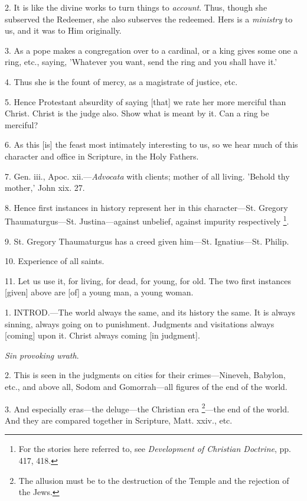 2. It is like the divine works to turn things to \emph{account}.
Thus, though she subserved the Redeemer, she also subserves the
redeemed. Hers is a \emph{ministry} to us, and it was to Him
originally.

3. As a pope makes a congregation over to a
cardinal, or a king gives some one a ring, etc., saying, 'Whatever you
want, send the ring and you shall have it.'

4. Thus she is the fount of mercy, as a
magistrate of justice, etc.

5. Hence Protestant absurdity of saying [that] we
rate her more merciful than Christ. Christ is the judge also. Show
what is meant by it. Can a ring be merciful?

6. As this [is] the feast most intimately
interesting to us, so we hear much of this character and office in
Scripture, in the Holy Fathers.

7. Gen. iii., Apoc. xii.—\emph{Advocata} with
clients; mother of all living. 'Behold thy mother,' John xix. 27.

8. Hence first instances in history represent her
in this character—St. Gregory Thaumaturgus—St. Justina—against
unbelief, against impurity respectively \footnote{For the stories here
referred to, see \emph{Development of Christian Doctrine}, pp. 417,
418.}.

9. St. Gregory Thaumaturgus has a creed given
him—St. Ignatius—St. Philip.

10. Experience of all saints.

11. Let us use it, for living, for dead, for
young, for old. The two first instances [given] above are [of] a young
man, a young woman.


1. INTROD.—The
world always the same, and its history the same. It is always sinning,
always going on to punishment. Judgments and visitations always
[coming] upon it. Christ always coming [in judgment].

\emph{Sin provoking wrath}.

2. This is seen in the judgments on cities for
their crimes—Nineveh, Babylon, etc., and above all, Sodom and
Gomorrah—all figures of the end of the world.

3. And especially eras—the deluge—the
Christian era \footnote{The allusion must be to
the destruction of the Temple and the rejection of the Jews.}—the
end of the world. And they are compared together in Scripture, Matt.
xxiv., etc.

